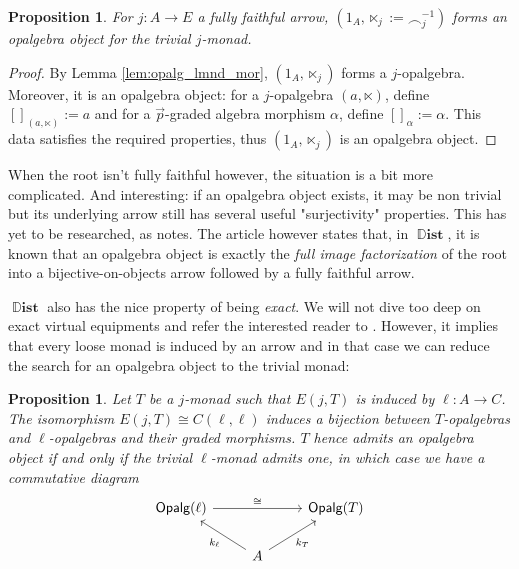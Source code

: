 \documentclass[10pt,a4paper]{article}
\newcommand{\bb}[1]{\mathbb{#1}}
\newcommand{\cat}[1]{\textcat{#1}}
\newcommand{\textcat}[1]{{\normalfont\textsf{#1}}}
\newcommand{\simeqq}{\cong}
\DeclareMathOperator{\Dist}{\bb{D}\textbf{ist}}
\DeclareMathOperator{\Opalg}{\cat{Opalg}}
\theoremstyle{plain}
\newtheorem{proposition}[theorem]{Proposition}
\theoremstyle{definition}
\theoremstyle{remark}
\begin{document}
\begin{proposition}
    \label{prop:triv_rmnd_opalg}
    For $j : A\to E$ a fully faithful arrow, $(1_A, \ltimes_j := \smallfrown_j^{-1})$ forms an opalgebra object for the trivial $j$-monad.
\end{proposition}

\begin{proof}
    By Lemma \ref{lem:opalg_lmnd_mor}, $(1_A, \ltimes_j)$ forms a $j$-opalgebra. Moreover, it is an opalgebra object: for a $j$-opalgebra $(a, \ltimes)$, define $[]_{(a, \ltimes)} := a$ and for a $\vec p$-graded algebra morphism $\alpha$, define $[]_\alpha := \alpha$. This data satisfies the required properties, thus $(1_A, \ltimes_j)$ is an opalgebra object.
\end{proof}

When the root isn't fully faithful however, the situation is a bit more complicated. And interesting: if an opalgebra object exists, it may be non trivial but its underlying arrow still has several useful "surjectivity" properties. This has yet to be researched, as \cite{arkor2024formaltheoryrelativemonads} notes. The article however states that, in $\Dist$, it is known that an opalgebra object is exactly the \textit{full image factorization} of the root into a bijective-on-objects arrow followed by a fully faithful arrow.

$\Dist$ also has the nice property of being \textit{exact}. We will not dive too deep on exact virtual equipments and refer the interested reader to \cite{arkor2024nervetheoremrelativemonads}. However, it implies that every loose monad is induced by an arrow and in that case we can reduce the search for an opalgebra object to the trivial monad:

\begin{proposition}
    Let $T$ be a $j$-monad such that $E(j, T)$ is induced by $\ell : A\to C$. The isomorphism $E(j, T) \simeqq C(\ell, \ell)$ induces a bijection between $T$-opalgebras and $\ell$-opalgebras and their graded morphisms. $T$ hence admits an opalgebra object if and only if the trivial $\ell$-monad admits one, in which case we have a commutative diagram
    \[\begin{tikzcd}
        \Opalg(\ell) \ar[rr, "\simeqq"] && \Opalg(T)\\
        & \ar[ul, "k_\ell"] A \ar[ur, "k_T"'] &\\
    \end{tikzcd}\]
\end{proposition}
\end{document}
